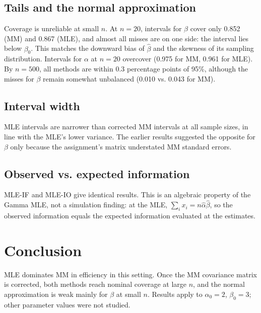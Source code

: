 \documentclass[11pt,a4paper]{article}
\begin{document}
\subsection{Tails and the normal approximation}
Coverage is unreliable at small $n$. At $n = 20$, intervals for $\beta$ cover only 0.852 (MM) and 0.867 (MLE), and almost all misses are on one side: the interval lies below $\beta_0$. This matches the downward bias of $\hat\beta$ and the skewness of its sampling distribution. Intervals for $\alpha$ at $n = 20$ overcover (0.975 for MM, 0.961 for MLE). By $n = 500$, all methods are within 0.3 percentage points of 95\%, although the misses for $\beta$ remain somewhat unbalanced (0.010 vs. 0.043 for MM).

\subsection{Interval width}
MLE intervals are narrower than corrected MM intervals at all sample sizes, in line with the MLE's lower variance. The earlier results suggested the opposite for $\beta$ only because the assignment's matrix understated MM standard errors.

\subsection{Observed vs. expected information}
MLE-IF and MLE-IO give identical results. This is an algebraic property of the Gamma MLE, not a simulation finding: at the MLE, $\sum_i x_i = n\hat\alpha\hat\beta$, so the observed information equals the expected information evaluated at the estimates.

\section{Conclusion}
MLE dominates MM in efficiency in this setting. Once the MM covariance matrix is corrected, both methods reach nominal coverage at large $n$, and the normal approximation is weak mainly for $\beta$ at small $n$. Results apply to $\alpha_0 = 2$, $\beta_0 = 3$; other parameter values were not studied.
\end{document}
